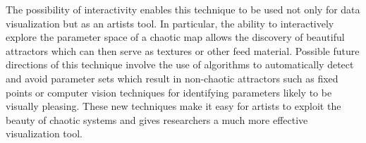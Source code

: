 \documentclass{acmsiggraph}
\begin{document}
The possibility of interactivity enables this technique to be used not only
for data visualization but as an artists tool. In particular, the ability
to interactively explore the parameter space of a chaotic map allows the
discovery of beautiful attractors which can then serve as textures or other
feed material. Possible future directions of this technique involve the use
of algorithms to automatically detect and avoid parameter sets which
result in non-chaotic attractors such as fixed points or computer vision
techniques for identifying parameters likely to be visually pleasing.
These new techniques make it easy for artists to exploit the beauty of chaotic
systems and gives researchers a much more effective visualization tool.
\end{document}
